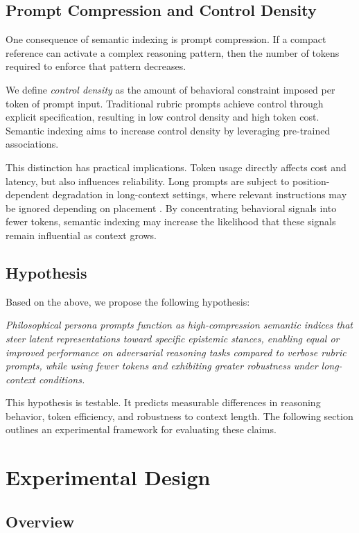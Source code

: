 \documentclass[11pt]{article}
\begin{document}
\subsection{Prompt Compression and Control Density}

One consequence of semantic indexing is prompt compression. If a compact reference can activate a complex reasoning pattern, then the number of tokens required to enforce that pattern decreases.

We define \emph{control density} as the amount of behavioral constraint imposed per token of prompt input. Traditional rubric prompts achieve control through explicit specification, resulting in low control density and high token cost. Semantic indexing aims to increase control density by leveraging pre-trained associations.

This distinction has practical implications. Token usage directly affects cost and latency, but also influences reliability. Long prompts are subject to position-dependent degradation in long-context settings, where relevant instructions may be ignored depending on placement \cite{liu2023lostmiddle}. By concentrating behavioral signals into fewer tokens, semantic indexing may increase the likelihood that these signals remain influential as context grows.

\subsection{Hypothesis}

Based on the above, we propose the following hypothesis:

\emph{Philosophical persona prompts function as high-compression semantic indices that steer latent representations toward specific epistemic stances, enabling equal or improved performance on adversarial reasoning tasks compared to verbose rubric prompts, while using fewer tokens and exhibiting greater robustness under long-context conditions.}

This hypothesis is testable. It predicts measurable differences in reasoning behavior, token efficiency, and robustness to context length. The following section outlines an experimental framework for evaluating these claims.

\section{Experimental Design}

\subsection{Overview}
\end{document}

